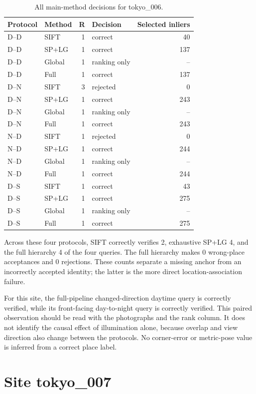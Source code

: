 \begin{table}[H]\centering\small
\caption{All main-method decisions for tokyo\_006.}\label{tab:tokyo-site-6}
\begin{tabular}{llrlr}\toprule
Protocol & Method & R & Decision & Selected inliers \\
\midrule
D--D & SIFT & 1 & correct & 40 \\
D--D & SP+LG & 1 & correct & 137 \\
D--D & Global & 1 & ranking only & -- \\
D--D & Full & 1 & correct & 137 \\
D--N & SIFT & 3 & rejected & 0 \\
D--N & SP+LG & 1 & correct & 243 \\
D--N & Global & 1 & ranking only & -- \\
D--N & Full & 1 & correct & 243 \\
N--D & SIFT & 1 & rejected & 0 \\
N--D & SP+LG & 1 & correct & 244 \\
N--D & Global & 1 & ranking only & -- \\
N--D & Full & 1 & correct & 244 \\
D--S & SIFT & 1 & correct & 43 \\
D--S & SP+LG & 1 & correct & 275 \\
D--S & Global & 1 & ranking only & -- \\
D--S & Full & 1 & correct & 275 \\
\bottomrule\end{tabular}\end{table}


Across these four protocols, SIFT correctly verifies 2, exhaustive SP+LG 4, and the full hierarchy 4 of the four queries. The full hierarchy makes 0 wrong-place acceptances and 0 rejections. These counts separate a missing anchor from an incorrectly accepted identity; the latter is the more direct location-association failure.

For this site, the full-pipeline changed-direction daytime query is correctly verified, while its front-facing day-to-night query is correctly verified. This paired observation should be read with the photographs and the rank column. It does not identify the causal effect of illumination alone, because overlap and view direction also change between the protocols. No corner-error or metric-pose value is inferred from a correct place label.

\section{Site tokyo\_007}

